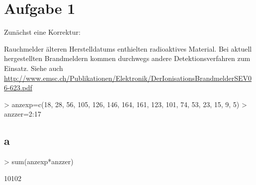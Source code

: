 

\section{Aufgabe 1}
Zunächst eine Korrektur: 

Rauchmelder älteren Herstelldatums enthielten radioaktives Material. 
Bei aktuell hergestellten Brandmeldern kommen durchwegs andere 
Detektionsverfahren zum Einsatz. Siehe auch 
\url{http://www.emsc.ch/Publikationen/Elektronik/DerIonisationsBrandmelderSEV06-623.pdf}

\begin{Schunk}
\begin{Sinput}
> anzexp=c(18, 28, 56, 105, 126, 146, 164, 161, 123, 101, 74, 53, 23, 15, 9, 5)
> anzzer=2:17
\end{Sinput}
\end{Schunk}

\subsection{a}
\begin{Schunk}
\begin{Sinput}
> sum(anzexp*anzzer)
\end{Sinput}
\begin{Soutput}
[1] 10102
\end{Soutput}
\end{Schunk}

